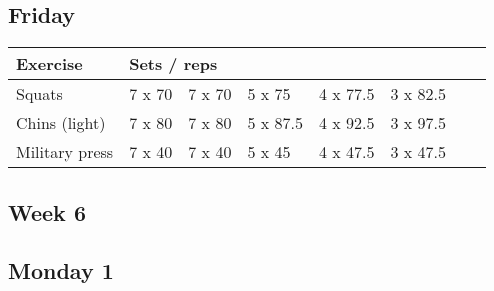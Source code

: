 \documentclass[12pt, a4paper]{article}%
\begin{document}
  \subsection*{\hspace{0.5em} Friday }


  \begin{tabular}{l|lllllll}
  \hspace{0.75em} \textbf{Exercise} & \multicolumn{ 7 }{l}{ \textbf{Sets / reps} } \\ \hline

            \hspace{0.75em} Squats
            & 7 x 70
            & 7 x 70
            & 5 x 75
            & 4 x 77.5
            & 3 x 82.5
            & 
            & 
            \\


            \hspace{0.75em} Chins (light)
            & 7 x 80
            & 7 x 80
            & 5 x 87.5
            & 4 x 92.5
            & 3 x 97.5
            & 
            & 
            \\


            \hspace{0.75em} Military press
            & 7 x 40
            & 7 x 40
            & 5 x 45
            & 4 x 47.5
            & 3 x 47.5
            & 
            & 
            \\


  \end{tabular}


\clearpage \subsection*{\hspace{0.25em} Week 6 }
  \subsection*{\hspace{0.5em} Monday 1 }
\end{document}
